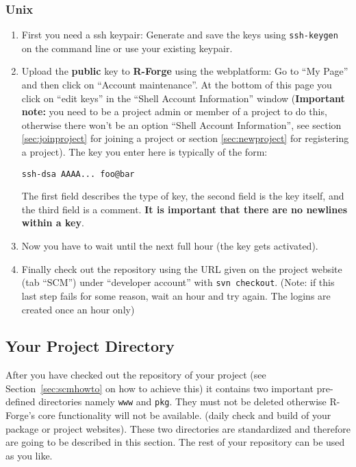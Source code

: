 \documentclass[a4paper]{article}
\begin{document}
\subsubsection{Unix}

\begin{enumerate}
\item First you need a ssh keypair: Generate and save the keys
  using \texttt{ssh-keygen} on the command line or use your existing keypair.  
\item Upload the \textbf{public} key to \textbf{R-Forge} using the webplatform: Go to
  ``My Page'' and then click on ``Account maintenance''. At the bottom
  of this page you click on ``edit keys'' in the ``Shell Account
  Information'' window (\textbf{Important note:} you need to be a project admin
  or member of a project to do this, otherwise there won't be an
  option ``Shell Account Information'', see section
  \ref{sec:joinproject} for joining a project or section
  \ref{sec:newproject} for registering a project).
  The key you enter here is typically of the form:
\begin{verbatim}
ssh-dsa AAAA... foo@bar
\end{verbatim}
  The first field
  describes the type of key, the second field is the key itself, and
  the third field is a comment. \textbf{It is important that there are
    no newlines within a key}.
\item Now you have to wait until the next full hour (the key gets activated).
\item Finally check out the repository using the URL given on the
  project website (tab ``SCM'') under ``developer account'' with
  \texttt{svn checkout}. (Note: if this last step
  fails for some reason, wait an hour and try again. The logins are
  created once an hour only)
\end{enumerate}

\subsection{Your Project Directory}
After you have checked out the repository of your project (see
Section~\ref{sec:scmhowto} on how to achieve this) it contains two
important pre-defined directories namely 
\texttt{www} and \texttt{pkg}. They must not be
deleted otherwise R-Forge's core functionality will not be available.
(daily check and build of your package or project websites).
These two
directories are standardized and therefore are going to be described
in this section. The rest of your repository can be used as you like.
\end{document}
